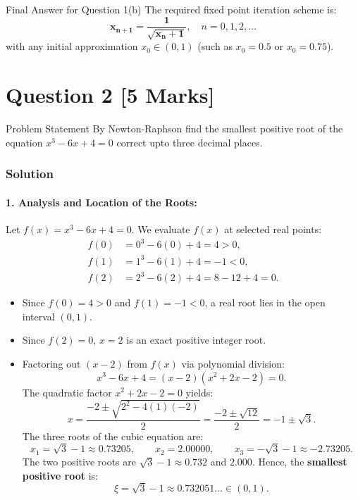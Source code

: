 \documentclass[11pt,a4paper]{article}
\begin{document}
\begin{answerbox}{Final Answer for Question 1(b)}
The required fixed point iteration scheme is:
\[
\mathbf{x_{n+1} = \frac{1}{\sqrt{x_n + 1}}}, \quad n = 0, 1, 2, \dots
\]
with any initial approximation $x_0 \in (0, 1)$ (such as $x_0 = 0.5$ or $x_0 = 0.75$).
\end{answerbox}

\vspace{0.8cm}

\section*{Question 2 \hfill \normalsize [5 Marks]}

\begin{questionbox}{Problem Statement}
By Newton-Raphson find the smallest positive root of the equation $x^3 - 6x + 4 = 0$ correct upto three decimal places.
\end{questionbox}

\subsubsection*{Solution}

\paragraph{1. Analysis and Location of the Roots:}
Let $f(x) = x^3 - 6x + 4 = 0$.
We evaluate $f(x)$ at selected real points:
\begin{align*}
f(0) &= 0^3 - 6(0) + 4 = 4 > 0, \\
f(1) &= 1^3 - 6(1) + 4 = -1 < 0, \\
f(2) &= 2^3 - 6(2) + 4 = 8 - 12 + 4 = 0.
\end{align*}
\begin{itemize}
    \item Since $f(0) = 4 > 0$ and $f(1) = -1 < 0$, a real root lies in the open interval $(0, 1)$.
    \item Since $f(2) = 0$, $x = 2$ is an exact positive integer root.
    \item Factoring out $(x - 2)$ from $f(x)$ via polynomial division:
    \[
    x^3 - 6x + 4 = (x - 2)(x^2 + 2x - 2) = 0.
    \]
    The quadratic factor $x^2 + 2x - 2 = 0$ yields:
    \[
    x = \frac{-2 \pm \sqrt{2^2 - 4(1)(-2)}}{2} = \frac{-2 \pm \sqrt{12}}{2} = -1 \pm \sqrt{3}.
    \]
    The three roots of the cubic equation are:
    \[
    x_1 = \sqrt{3} - 1 \approx 0.73205, \qquad x_2 = 2.00000, \qquad x_3 = -\sqrt{3} - 1 \approx -2.73205.
    \]
    The two positive roots are $\sqrt{3} - 1 \approx 0.732$ and $2.000$.
    Hence, the \textbf{smallest positive root} is:
    \[
    \xi = \sqrt{3} - 1 \approx 0.732051 \dots \in (0, 1).
    \]
\end{itemize}
\end{document}
